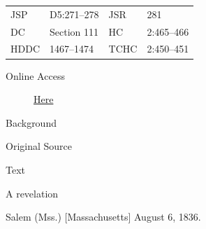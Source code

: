 					\begin{tabular}{p{0.5in}p{1in}p{0.5in}p{1in}}
					JSP	 	& D5:271--278		& JSR 		& 281 \\
					DC	 	& Section 111		& HC 		& 2:465--466 \\
					HDDC 	& 1467--1474		& TCHC 		& 2:450--451 \\
					\end{tabular}
				
				\begin{description}
					\item[Online Access] \href{https://www.josephsmithpapers.org/paper-summary/revelation-6-august-1836-dc-111/1}{Here}
				\end{description}
				
				\begin{description}
					\item[Background]
				\end{description}
				
				
				\begin{description}
					\item[Original Source]
				\end{description}
				
				
				\begin{description}
					\item[Text]
				\end{description}
				
					\begin{tightcenter}
					A revelation
					
					Salem (Mss.) [Massachusetts] August 6, 1836.
					\end{tightcenter}
					
